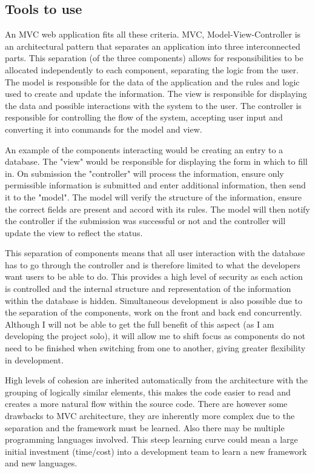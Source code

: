\documentclass[a4paper,12pt]{article}
\begin{document}
\subsection{Tools to use}
\par An MVC web application fits all these criteria. MVC, Model-View-Controller is an architectural pattern that separates an application into three interconnected parts. This separation (of the three components) allows for responsibilities to be allocated independently to each component, separating the logic from the user. The model is responsible for the data of the application and the rules and logic used to create and update the information. The view is responsible for displaying the data and possible interactions with the system to the user. The controller is responsible for controlling the flow of the system,  accepting user input and converting it into commands for the model and view.
\vspace{3mm}
\par An example of the components interacting would be creating an entry to a database. The "view" would be responsible for displaying the form in which to fill in. On submission the "controller" will process the information, ensure only permissible information is submitted and enter additional information, then send it to the "model". The model will verify the structure of the information, ensure the correct fields are present and accord with its rules. The model will then notify the controller if the submission was successful or not and the controller will update the view to reflect the status.
\vspace{3mm}
\par This separation of components means that all user interaction with the database has to go through the controller and is therefore limited to what the developers want users to be able to do. This provides a high level of security as each action is controlled and the internal structure and representation of the information within the database is hidden. Simultaneous development is also possible due to the separation of the components, work on the front and back end concurrently. Although I will not be able to get the full benefit of this aspect (as I am developing the project solo), it will allow me to shift focus as components do not need to be finished when switching from one to another, giving greater flexibility in development. 
\vspace{3mm}
\par High levels of cohesion are inherited automatically from the architecture with the grouping of logically similar elements, this makes the code easier to read and creates a more natural flow within the source code. There are however some drawbacks to MVC architecture, they are inherently more complex due to the separation and the framework must be learned. Also there may be multiple programming languages involved. This steep learning curve could mean a large initial investment (time/cost) into a development team to learn a new framework and new languages.
\end{document}
